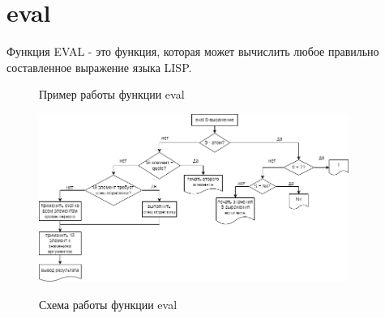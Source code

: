 \section{eval}

Функция EVAL - это функция, которая может вычислить любое правильно составленное 
выражение языка LISP.

\begin{figure}[H]
    \begin{listingbox}{}
        
    \end{listingbox}
    \caption{Пример работы функции eval}
    \label{lst:eval-example}
\end{figure}

\begin{figure}[H]
    \begin{imagebox}
        \centering
        \includegraphics[width=0.9\textwidth]{img/eval.drawio.png}
        \label{fig:eval-sheme}
    \end{imagebox}
    \caption{Схема работы функции eval}
\end{figure}